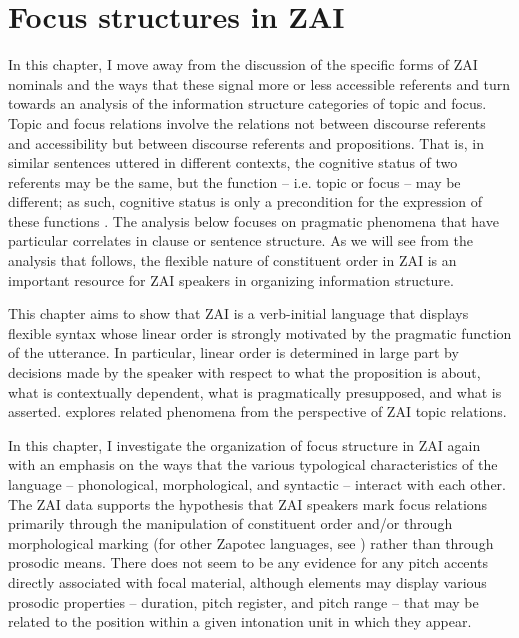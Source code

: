 

\chapter{Focus structures in ZAI}\label{focuschapter} 

In this chapter, I move away from the discussion of the specific forms of ZAI nominals and the ways that these signal more or less accessible referents and turn towards an analysis of the information structure categories of topic and focus. Topic and focus relations involve the relations not between discourse referents and accessibility but between discourse referents and propositions. That is, in similar sentences uttered in different contexts, the cognitive status of two referents may be the same, but the function -- i.e. topic or focus -- may be different; as such, cognitive status is only a precondition for the expression of these functions \citep{lambrecht1994}. The analysis below focuses on pragmatic phenomena that have particular correlates in clause or sentence structure. As we will see from the analysis that follows, the flexible nature of constituent order in ZAI is an important resource for ZAI speakers in organizing information structure.

This chapter aims to show that ZAI is a verb-initial language that displays flexible syntax whose linear order is strongly motivated by the pragmatic function of the utterance. In particular, linear order is determined in large part by decisions made by the speaker with respect to what the proposition is about, what is contextually dependent, what is pragmatically presupposed, and what is asserted.  explores related phenomena from the perspective of ZAI topic relations. 

In this chapter, I investigate the organization of focus structure in ZAI again with an emphasis on the ways that the various typological characteristics of the language -- phonological, morphological, and syntactic -- interact with each other. The ZAI data supports the hypothesis that ZAI speakers mark focus relations primarily through the manipulation of constituent order and/or through morphological marking (for other Zapotec languages, see \citealt{broadwell1999b,lee2000}) rather than through prosodic means. There does not seem to be any evidence for any pitch accents directly associated with focal material, although elements may display various prosodic properties -- duration, pitch register, and pitch range -- that may be related to the position within a given intonation unit in which they appear.

